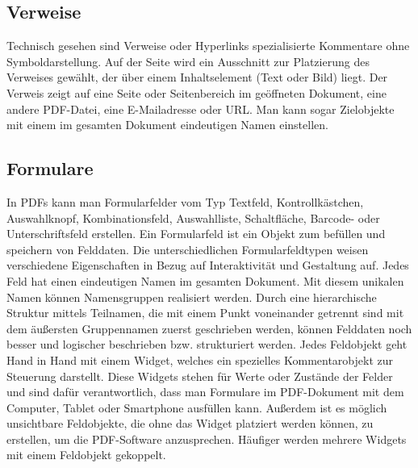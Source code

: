 \subsection{Verweise}
Technisch gesehen sind Verweise oder Hyperlinks spezialisierte Kommentare ohne Symboldarstellung. Auf der Seite wird ein Ausschnitt zur Platzierung des Verweises gewählt, der über einem Inhaltselement (Text oder Bild) liegt. Der Verweis zeigt auf eine Seite oder Seitenbereich im geöffneten Dokument, eine andere PDF-Datei, eine E-Mailadresse oder URL. Man kann sogar Zielobjekte mit einem im gesamten Dokument eindeutigen Namen einstellen. \cite{softx}

\subsection{Formulare}
In PDFs kann man Formularfelder vom Typ Textfeld, Kontrollkästchen, Auswahlknopf, Kombinationsfeld, Auswahlliste, Schaltfläche, Barcode- oder Unterschriftsfeld erstellen. Ein Formularfeld ist ein Objekt zum befüllen und speichern von Felddaten. Die unterschiedlichen Formularfeldtypen weisen verschiedene Eigenschaften in Bezug auf Interaktivität und Gestaltung auf. Jedes Feld hat einen eindeutigen Namen im gesamten Dokument. Mit diesem unikalen Namen können Namensgruppen realisiert werden. Durch eine hierarchische Struktur mittels Teilnamen, die mit einem Punkt voneinander getrennt sind mit dem äußersten Gruppennamen zuerst geschrieben werden, können Felddaten noch besser und logischer beschrieben bzw. strukturiert werden. Jedes Feldobjekt geht Hand in Hand mit einem Widget, welches ein spezielles Kommentarobjekt zur Steuerung darstellt. Diese Widgets stehen für Werte oder Zustände der Felder und sind dafür verantwortlich, dass man Formulare im PDF-Dokument mit dem Computer, Tablet oder Smartphone ausfüllen kann. Außerdem ist es möglich unsichtbare Feldobjekte, die ohne das Widget platziert werden können, zu erstellen, um die PDF-Software anzusprechen. Häufiger werden mehrere Widgets mit einem Feldobjekt gekoppelt. \cite{softx} \\
